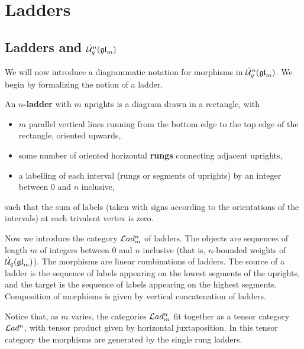 \documentclass[11pt]{amsart}
\begin{document}
\section{Ladders}
\label{sec:ladders}

\subsection{Ladders and \texorpdfstring{$\dot{{\mathcal{U}}}_q^n({\mathfrak{gl}}_m)$}{U\_q gl\_m} }
We will now introduce a diagrammatic notation for morphisms in $ \dot{{\mathcal{U}}}_q^n({\mathfrak{gl}}_m)$. We begin by formalizing the notion of a ladder.

\begin{defn}
An {\bf $n$-ladder} with $m$ uprights is a diagram drawn in a rectangle, with
\begin{itemize}
\item $m$ parallel vertical lines running from the bottom edge to the top edge of the rectangle, oriented upwards,
\item some number of oriented horizontal {\bf rungs} connecting adjacent uprights,
\item a labelling of each interval (rungs or segments of uprights) by an integer between $0$ and $n$ inclusive,
\end{itemize}
such that the sum of labels (taken with signs according to the orientations of the intervals) at each trivalent vertex is zero.
\end{defn}

Now we introduce the category $\mathcal{L}ad_m^n $ of ladders. The objects are sequences of length $m$ of integers between $0$ and $n$ inclusive (that is, $n$-bounded weights of $\dot{{\mathcal{U}}}_q({\mathfrak{gl}}_m)$). The morphisms are linear combinations of ladders. The source of a ladder is the sequence of labels appearing on the lowest segments of the uprights, and the target is the sequence of labels appearing on the highest segments. Composition of morphisms is given by vertical concatenation of ladders.

Notice that, as $m$ varies, the categories $\mathcal{L}ad_m^n$ fit together as a tensor category $\mathcal{L}ad^n$, with tensor product given by horizontal juxtaposition.  In this tensor category the morphisms are generated by the single rung ladders.
\end{document}
